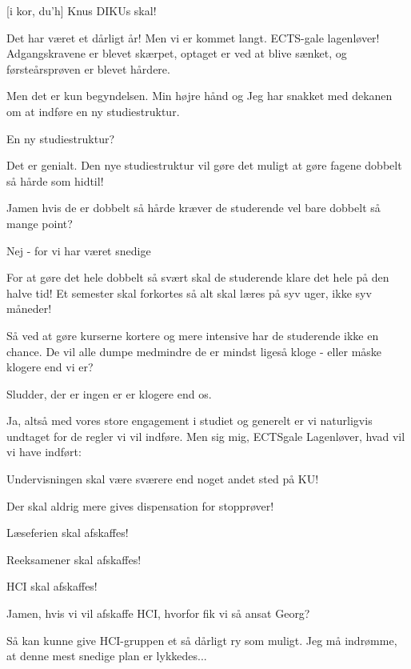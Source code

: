 \documentclass[a4paper,11pt]{article}
\begin{document}
\begin{sketch}
[i kor, du'h] Knus DIKUs skal!


 Det har været et dårligt år!  Men vi er
kommet langt. ECTS-gale lagenløver! Adgangskravene er blevet skærpet,
optaget er ved at blive sænket, og førsteårsprøven er blevet hårdere.


 Men det er kun begyndelsen. Min højre hånd  og Jeg har snakket med dekanen om at indføre en ny
studiestruktur.  

 En ny studiestruktur?

 Det er genialt. Den nye studiestruktur vil gøre det muligt at gøre
fagene dobbelt så hårde som hidtil!

 Jamen hvis de er dobbelt så hårde kræver de studerende vel bare dobbelt
så mange point?

 Nej - for vi har været snedige


 For at gøre det hele dobbelt så svært skal de studerende klare det
hele på den halve tid! Et semester skal forkortes så alt skal læres på syv uger,
ikke syv måneder!

 Så ved at gøre kurserne kortere og mere intensive har de studerende
ikke en chance. De vil alle dumpe medmindre de er mindst ligeså kloge - eller
måske klogere end vi er?

 Sludder, der er ingen er er klogere end os.

 Ja, altså med vores store engagement i studiet og generelt er vi
naturligvis undtaget for de regler vi vil indføre. Men sig mig, ECTSgale
Lagenløver, hvad vil vi have indført:

 Undervisningen skal være sværere end noget andet sted på KU!

 Der skal aldrig mere gives dispensation for stopprøver!

 Læseferien skal afskaffes!

 Reeksamener skal afskaffes!

 HCI skal afskaffes!

 Jamen, hvis vi vil afskaffe HCI, hvorfor fik vi så ansat Georg?

 Så kan kunne give HCI-gruppen et så dårligt ry som muligt. Jeg må
indrømme, at denne mest snedige plan er lykkedes...


\end{sketch}
\end{document}
